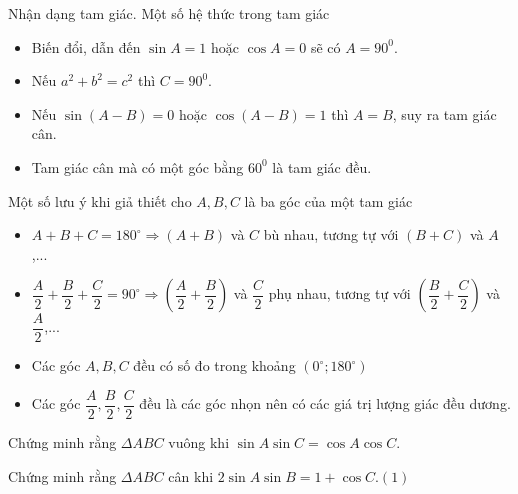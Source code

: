 \begin{dang}{Nhận dạng tam giác. Một số hệ thức trong tam giác}
	\begin{itemize}
		\item  Biến đổi, dẫn đến $\sin A = 1$ hoặc $\cos A = 0$ sẽ có $A=90^0$.
		\item  Nếu $a^2+b^2=c^2$ thì $C=90^0$.
		\item  Nếu $\sin (A - B) = 0$ hoặc $\cos (A - B) = 1$ thì $A=B$, suy ra tam giác cân.
		\item Tam giác cân mà có một góc bằng $60^0$ là tam giác đều.
	\end{itemize}
	Một số lưu ý khi giả thiết cho $A,B,C$ là ba góc của một tam giác
	\begin{itemize}
		\item $A+B+C=180^\circ \Rightarrow (A+B)$ và $C$ bù nhau, tương tự với $(B+C)$ và $A$,...
		\item $\dfrac{A}{2}+\dfrac{B}{2}+\dfrac{C}{2}=90^\circ \Rightarrow \left(\dfrac{A}{2}+\dfrac{B}{2} \right)$ và $\dfrac{C}{2}$ phụ nhau, tương tự với $\left(\dfrac{B}{2}+\dfrac{C}{2} \right)$ và $\dfrac{A}{2}$,...
		\item Các góc $A,B,C$ đều có số đo trong khoảng $\left(0^\circ;180^\circ \right)$
		\item Các góc $\dfrac{A}{2},\dfrac{B}{2},\dfrac{C}{2}$ đều là các góc nhọn nên có các giá trị lượng giác đều dương.
	\end{itemize}
\end{dang}

\begin{vd}%
	Chứng minh rằng $\Delta ABC$ vuông khi 
	$\sin A\sin C = \cos A\cos C$.
\end{vd}

\begin{vd}%
	Chứng minh rằng $\Delta ABC$ cân khi 
	$2\sin A\sin B = 1 + \cos C$.\hfill$(1)$
\end{vd}

